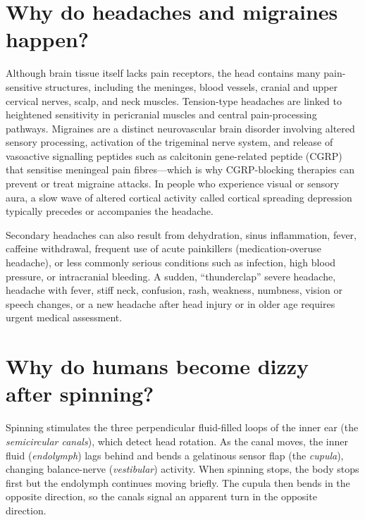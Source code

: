 \documentclass[11pt,oneside]{report}
\begin{document}
\section{Why do headaches and migraines happen?}

Although brain tissue itself lacks pain receptors, the head contains many
pain-sensitive structures, including the meninges, blood vessels, cranial and
upper cervical nerves, scalp, and neck muscles. Tension-type headaches are
linked to heightened sensitivity in pericranial muscles and central
pain-processing pathways. Migraines are a distinct neurovascular brain disorder involving altered sensory
processing, activation of the trigeminal nerve system, and release of
vasoactive signalling peptides such as calcitonin gene-related peptide (CGRP)
that sensitise meningeal pain fibres---which is why CGRP-blocking therapies can
prevent or treat migraine attacks. In people who experience visual or sensory
aura, a slow wave of altered cortical activity called cortical spreading
depression typically precedes or accompanies the headache.

Secondary headaches can also result from dehydration, sinus inflammation,
fever, caffeine withdrawal, frequent use of acute painkillers
(medication-overuse headache), or less commonly serious conditions such as
infection, high blood pressure, or intracranial bleeding. A sudden,
``thunderclap'' severe headache, headache with fever, stiff neck, confusion,
rash, weakness, numbness, vision or speech changes, or a new headache after
head injury or in older age requires urgent medical assessment.

\section{Why do humans become dizzy after spinning?}

Spinning stimulates the three perpendicular fluid-filled loops of the inner ear
(the \emph{semicircular canals}), which detect head rotation. As the canal
moves, the inner fluid (\emph{endolymph}) lags behind and bends a gelatinous
sensor flap (the \emph{cupula}), changing balance-nerve (\emph{vestibular})
activity. When spinning stops,
the body stops first but the endolymph continues moving briefly. The cupula
then bends in the opposite direction, so the canals signal an apparent turn in
the opposite direction.
\end{document}
